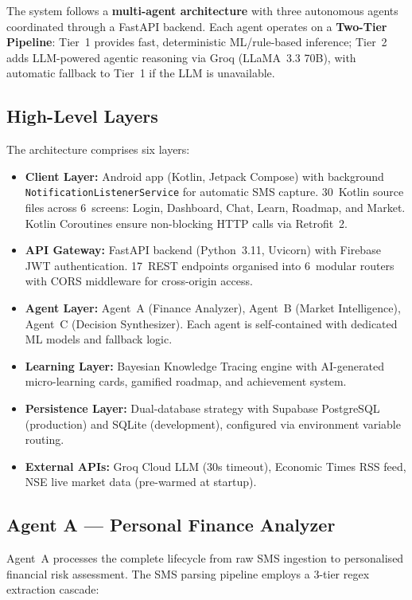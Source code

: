 \documentclass[conference]{IEEEtran}
\begin{document}
The system follows a \textbf{multi-agent architecture} with three autonomous agents coordinated through a FastAPI backend. Each agent operates on a \textbf{Two-Tier Pipeline}: Tier~1 provides fast, deterministic ML/rule-based inference; Tier~2 adds LLM-powered agentic reasoning via Groq (LLaMA~3.3 70B), with automatic fallback to Tier~1 if the LLM is unavailable.

\subsection{High-Level Layers}

The architecture comprises six layers:
\begin{itemize}[leftmargin=*]
  \item \textbf{Client Layer:} Android app (Kotlin, Jetpack Compose) with background \texttt{NotificationListenerService} for automatic SMS capture. 30~Kotlin source files across 6~screens: Login, Dashboard, Chat, Learn, Roadmap, and Market. Kotlin Coroutines ensure non-blocking HTTP calls via Retrofit~2.
  \item \textbf{API Gateway:} FastAPI backend (Python~3.11, Uvicorn) with Firebase JWT authentication. 17~REST endpoints organised into 6~modular routers with CORS middleware for cross-origin access.
  \item \textbf{Agent Layer:} Agent~A (Finance Analyzer), Agent~B (Market Intelligence), Agent~C (Decision Synthesizer). Each agent is self-contained with dedicated ML models and fallback logic.
  \item \textbf{Learning Layer:} Bayesian Knowledge Tracing engine with AI-generated micro-learning cards, gamified roadmap, and achievement system.
  \item \textbf{Persistence Layer:} Dual-database strategy with Supabase PostgreSQL (production) and SQLite (development), configured via environment variable routing.
  \item \textbf{External APIs:} Groq Cloud LLM (30s timeout), Economic Times RSS feed, NSE live market data (pre-warmed at startup).
\end{itemize}

\subsection{Agent A --- Personal Finance Analyzer}

Agent~A processes the complete lifecycle from raw SMS ingestion to personalised financial risk assessment. The SMS parsing pipeline employs a 3-tier regex extraction cascade:
\end{document}
